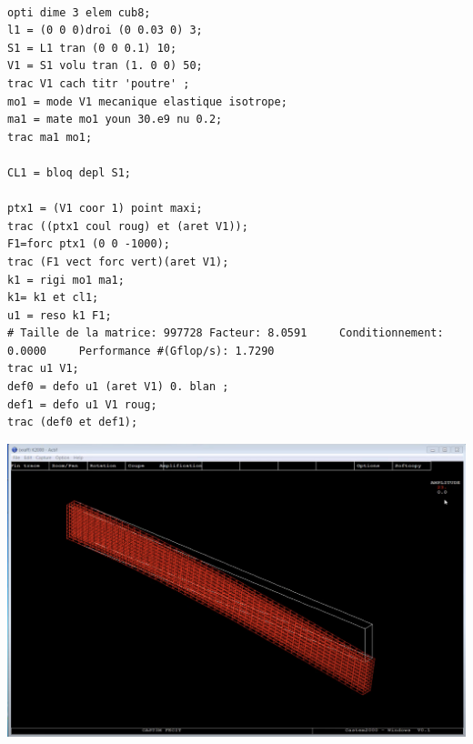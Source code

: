 \documentclass{article}
\begin{document}
\begin{verbatim}

opti dime 3 elem cub8;
l1 = (0 0 0)droi (0 0.03 0) 3;
S1 = L1 tran (0 0 0.1) 10;
V1 = S1 volu tran (1. 0 0) 50;
trac V1 cach titr 'poutre' ;
mo1 = mode V1 mecanique elastique isotrope;
ma1 = mate mo1 youn 30.e9 nu 0.2;
trac ma1 mo1;

CL1 = bloq depl S1;

ptx1 = (V1 coor 1) point maxi;
trac ((ptx1 coul roug) et (aret V1));
F1=forc ptx1 (0 0 -1000);
trac (F1 vect forc vert)(aret V1);
k1 = rigi mo1 ma1;
k1= k1 et cl1;
u1 = reso k1 F1;
# Taille de la matrice: 997728 Facteur: 8.0591     Conditionnement: 0.0000     Performance #(Gflop/s): 1.7290
trac u1 V1;
def0 = defo u1 (aret V1) 0. blan ;
def1 = defo u1 V1 roug;
trac (def0 et def1);

\end{verbatim}

\includegraphics[scale=0.4]{castemVideo01.png} 



 
\end{document}
